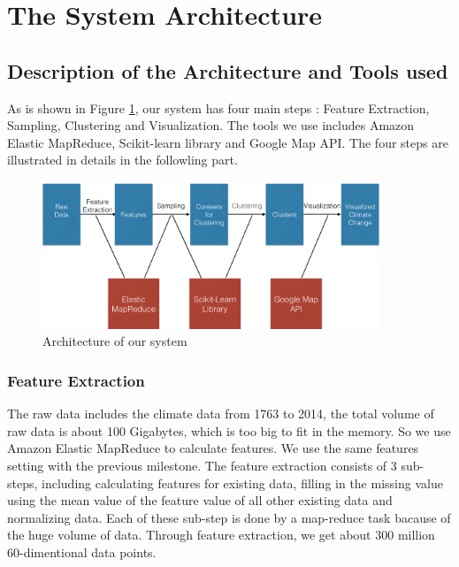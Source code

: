 \section{The System Architecture}

\subsection{Description of the Architecture and Tools used}
As is shown in Figure \ref{fig:archi}, our system has four main steps : Feature Extraction, Sampling, Clustering and Visualization. The tools we use includes Amazon Elastic MapReduce, Scikit-learn library and Google Map API. The four steps are illustrated in details in the followling part.
\begin{figure}[htbp]
				\centering
				\includegraphics[width=0.9\textwidth]{figure/Architecture.png}
				\caption{Architecture of our system}
				\label{fig:archi}
 \end{figure}
 
\subsubsection{Feature Extraction}
The raw data includes the climate data from 1763 to 2014, the total volume of raw data is about 100 Gigabytes, which is too big to fit in the memory. So we use Amazon Elastic MapReduce to calculate features. We use the same features setting with the previous milestone. The feature extraction consists of 3 sub-steps, including calculating features for existing data, filling in the missing value using the mean value of the feature value of all other existing data and normalizing data. Each of these sub-step is done by a map-reduce task bacause of the huge volume of data. Through feature extraction, we get about 300 million 60-dimentional data points.

